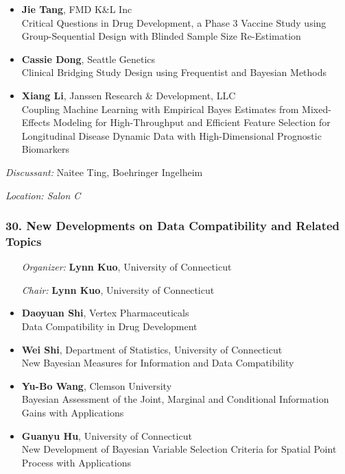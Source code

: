 \begin{itemize}
\item \textbf{Jie Tang}, FMD K\&L Inc \\
Critical Questions in Drug Development, a Phase 3 Vaccine Study using Group-Sequential Design with Blinded Sample Size Re-Estimation
\item \textbf{Cassie Dong}, Seattle Genetics \\
Clinical Bridging Study Design using Frequentist and Bayesian Methods
\item \textbf{Xiang Li}, Janssen Research \& Development, LLC \\
Coupling Machine Learning with Empirical Bayes Estimates from Mixed-Effects Modeling for High-Throughput and Efficient Feature Selection for Longitudinal Disease Dynamic Data with High-Dimensional Prognostic Biomarkers
\end{itemize}

\emph{Discussant:} Naitee Ting, Boehringer Ingelheim

\emph{Location: Salon C}

\subsubsection*{30. New Developments on Data Compatibility and Related  Topics}

\begin{enumerate}[align=left]
\item [\emph{Organizer:}] \textbf{Lynn Kuo}, University of Connecticut
\item [\emph{Chair:}] \textbf{Lynn Kuo}, University of Connecticut
\end{enumerate}

\begin{itemize}
\item \textbf{Daoyuan Shi}, Vertex Pharmaceuticals \\
Data Compatibility in Drug Development
\item \textbf{Wei Shi}, Department of Statistics, University of Connecticut \\
New Bayesian Measures for Information and Data Compatibility
\item \textbf{Yu-Bo Wang}, Clemson University \\
Bayesian Assessment of the Joint, Marginal and Conditional Information Gains with Applications
\item \textbf{Guanyu Hu}, University of Connecticut \\
New Development of Bayesian Variable Selection Criteria for Spatial Point Process with Applications
\end{itemize}

